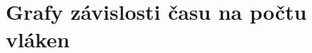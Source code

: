 \documentclass[12pt]{article}
\begin{document}
\section{Grafy závislosti času na počtu vláken}
\begin{comment}
\subsection{Propojovací síť InfiniBand}
Grafy závislosti času na počtu procesorů při použití propojovací sítě InfiniBand.
\begin{figure}[H]
\begin{center}
\caption{Test A}
\label{fig:testAinfib}
\end{center}
\end{figure}

\begin{figure}[H]
\begin{center}
\caption{Test B}
\label{fig:testBinfib}
\end{center}
\end{figure}

\begin{figure}[H]
\begin{center}
\caption{Test C}
\label{fig:testCinfib}
\end{center}
\end{figure}

\subsection{Propojovací síť Ethernet}
Grafy závislosti času na počtu procesorů při použití propojovací sítě Ethernet.
\begin{figure}[H]
\begin{center}
\caption{Test A}
\label{fig:testAether}
\end{center}
\end{figure}

\begin{figure}[H]
\begin{center}
\caption{Test B}
\label{fig:testBether}
\end{center}
\end{figure}


\end{comment}
\end{document}
